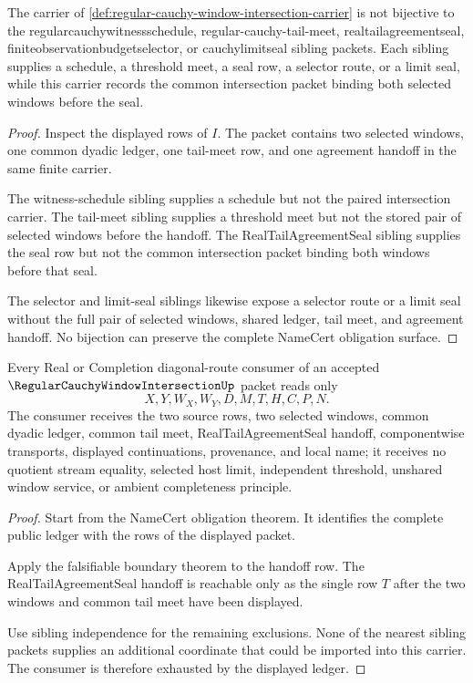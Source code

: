 \begin{theorem}
\label{thm:regular-cauchy-window-intersection-sibling-independence}
The carrier of \autoref{def:regular-cauchy-window-intersection-carrier} is not bijective to the regularcauchywitnessschedule, regular-cauchy-tail-meet, realtailagreementseal, finiteobservationbudgetselector, or cauchylimitseal sibling packets. Each sibling supplies a schedule, a threshold meet, a seal row, a selector route, or a limit seal, while this carrier records the common intersection packet binding both selected windows before the seal.
\end{theorem}
\begin{proof}
Inspect the displayed rows of $I$. The packet contains two selected windows, one common dyadic ledger, one tail-meet row, and one agreement handoff in the same finite carrier.

The witness-schedule sibling supplies a schedule but not the paired intersection carrier. The tail-meet sibling supplies a threshold meet but not the stored pair of selected windows before the handoff. The RealTailAgreementSeal sibling supplies the seal row but not the common intersection packet binding both windows before that seal.

The selector and limit-seal siblings likewise expose a selector route or a limit seal without the full pair of selected windows, shared ledger, tail meet, and agreement handoff. No bijection can preserve the complete NameCert obligation surface.
\end{proof}

\begin{theorem}
\label{thm:regular-cauchy-window-intersection-ledger-exhaustion}
Every Real or Completion diagonal-route consumer of an accepted $\RegularCauchyWindowIntersectionUp$ packet reads only
$$
X,Y,W_X,W_Y,D,M,T,H,C,P,N.
$$
The consumer receives the two source rows, two selected windows, common dyadic ledger, common tail meet, RealTailAgreementSeal handoff, componentwise transports, displayed continuations, provenance, and local name; it receives no quotient stream equality, selected host limit, independent threshold, unshared window service, or ambient completeness principle.
\end{theorem}
\begin{proof}
Start from the NameCert obligation theorem. It identifies the complete public ledger with the rows of the displayed packet.

Apply the falsifiable boundary theorem to the handoff row. The RealTailAgreementSeal handoff is reachable only as the single row $T$ after the two windows and common tail meet have been displayed.

Use sibling independence for the remaining exclusions. None of the nearest sibling packets supplies an additional coordinate that could be imported into this carrier. The consumer is therefore exhausted by the displayed ledger.
\end{proof}

